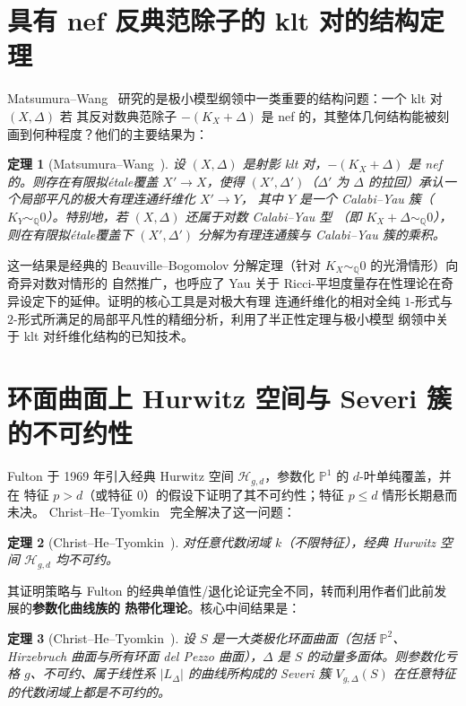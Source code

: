 \documentclass[11pt,a4paper]{article}
\newtheorem{theorem}{定理}[section]
\theoremstyle{definition}
\theoremstyle{remark}
\newcommand{\Q}{\mathbb{Q}}
\newcommand{\PP}{\mathbb{P}}
\begin{document}
\section{具有 nef 反典范除子的 klt 对的结构定理}

Matsumura--Wang~\cite{MW2025} 研究的是极小模型纲领中一类重要的结构问题：一个 klt 对 $(X,\Delta)$ 若
其反对数典范除子 $-(K_X+\Delta)$ 是 nef 的，其整体几何结构能被刻画到何种程度？他们的主要结果为：

\begin{theorem}[Matsumura--Wang~{\cite[主定理]{MW2025}}]
设 $(X,\Delta)$ 是射影 klt 对，$-(K_X+\Delta)$ 是 nef 的。则存在有限拟étale覆盖 $X' \to X$，使得
$(X',\Delta')$（$\Delta'$ 为 $\Delta$ 的拉回）承认一个局部平凡的极大有理连通纤维化 $X' \to Y$，
其中 $Y$ 是一个 Calabi--Yau 簇（$K_Y \sim_\Q 0$）。特别地，若 $(X,\Delta)$ 还属于对数 Calabi--Yau 型
（即 $K_X + \Delta \sim_\Q 0$），则在有限拟étale覆盖下 $(X',\Delta')$ 分解为有理连通簇与 Calabi--Yau
簇的乘积。
\end{theorem}

这一结果是经典的 Beauville--Bogomolov 分解定理（针对 $K_X\sim_\Q 0$ 的光滑情形）向奇异对数对情形的
自然推广，也呼应了 Yau 关于 Ricci-平坦度量存在性理论在奇异设定下的延伸。证明的核心工具是对极大有理
连通纤维化的相对全纯 $1$-形式与 $2$-形式所满足的局部平凡性的精细分析，利用了半正性定理与极小模型
纲领中关于 klt 对纤维化结构的已知技术。

\section{环面曲面上 Hurwitz 空间与 Severi 簇的不可约性}

Fulton 于 1969 年引入经典 Hurwitz 空间 $\mathcal{H}_{g,d}$，参数化 $\PP^1$ 的 $d$-叶单纯覆盖，并在
特征 $p > d$（或特征 $0$）的假设下证明了其不可约性；特征 $p \le d$ 情形长期悬而未决。
Christ--He--Tyomkin~\cite{CHT2026} 完全解决了这一问题：

\begin{theorem}[Christ--He--Tyomkin~{\cite[主定理]{CHT2026}}]
对任意代数闭域 $k$（不限特征），经典 Hurwitz 空间 $\mathcal{H}_{g,d}$ 均不可约。
\end{theorem}

其证明策略与 Fulton 的经典单值性/退化论证完全不同，转而利用作者们此前发展的\textbf{参数化曲线族的
热带化理论}。核心中间结果是：

\begin{theorem}[Christ--He--Tyomkin~{\cite[主定理]{CHT2026}}]
设 $S$ 是一大类极化环面曲面（包括 $\PP^2$、Hirzebruch 曲面与所有环面 del Pezzo 曲面），$\Delta$ 是
$S$ 的动量多面体。则参数化亏格 $g$、不可约、属于线性系 $|L_\Delta|$ 的曲线所构成的 Severi 簇
$V_{g,\Delta}(S)$ 在任意特征的代数闭域上都是不可约的。
\end{theorem}
\end{document}
